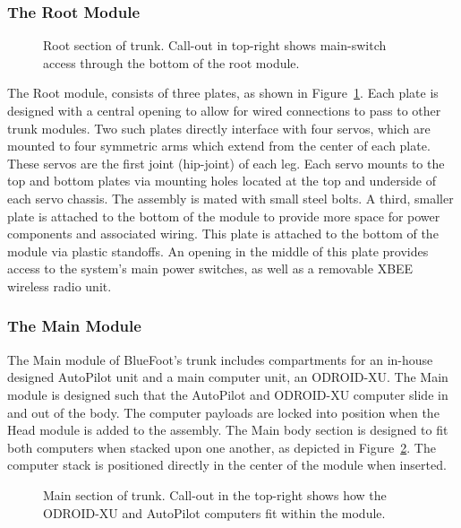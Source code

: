 			\subsubsection{The Root Module}

				\begin{figure}[h!]
					\centering
					\caption{Root section of trunk. Call-out in top-right shows main-switch access through the bottom of the root module.}
					\label{fig::root_module}
				\end{figure}

				The Root module, consists of three plates, as shown in Figure~\ref{fig::root_module}. Each plate is designed with a central opening to allow for wired connections to pass to other trunk modules. Two such plates directly interface with four servos, which are mounted to four symmetric arms which extend from the center of each plate. These servos are the first joint (hip-joint) of each leg. Each servo mounts to the top and bottom plates via mounting holes located at the top and underside of each servo chassis. The assembly is mated with small steel bolts. A third, smaller plate is attached to the bottom of the module to provide more space for power components and associated wiring. This plate is attached to the bottom of the module via plastic standoffs. An opening in the middle of this plate provides access to the system's main power switches, as well as a removable XBEE wireless radio unit.

			\subsubsection{The Main Module}
		
				The Main module of BlueFoot's trunk includes compartments for an in-house designed AutoPilot unit and a main computer unit, an ODROID-XU. The Main module is designed such that the AutoPilot and ODROID-XU computer slide in and out of the body. The computer payloads are locked into position when the Head module is added to the assembly. The Main body section is designed to fit both computers when stacked upon one another, as depicted in Figure~\ref{fig::main_module}. The computer stack is positioned directly in the center of the module when inserted.
%
				\begin{figure}[h!]
					\centering
					\caption{Main section of trunk. Call-out in the top-right shows how the ODROID-XU and AutoPilot computers fit within the module.}
					\label{fig::main_module}
				\end{figure}

